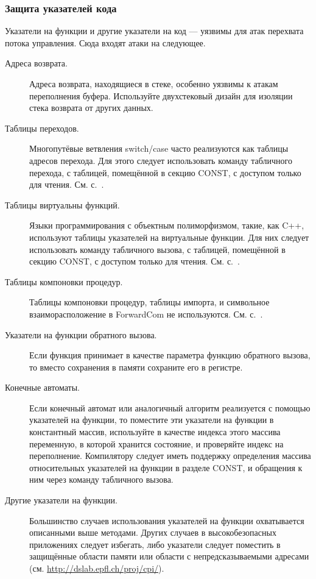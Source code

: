\documentclass[forwardcom.tex]{subfiles}
\begin{document}
\subsubsection{Защита указателей кода}
Указатели на функции и другие указатели на код --- уязвимы для атак перехвата потока управления. Сюда входят атаки на следующее.
\begin{description}
\item[Адреса возврата.]	Адреса возврата, находящиеся в стеке, особенно уязвимы к атакам переполнения буфера. Используйте двухстековый дизайн для изоляции стека возврата от других данных.

\item[Таблицы переходов.] Многопутёвые ветвления switch/case часто реализуются как таблицы адресов перехода. Для этого следует использовать команду табличного перехода, с таблицей, помещённой в секцию CONST, с доступом только для чтения. См. с.~\pageref{jumpTableInstruction}.

\item[Таблицы виртуальны функций.] Языки программирования с объектным полиморфизмом, такие, как C++, используют таблицы указателей на виртуальные функции. Для них следует использовать команду табличного вызова, с таблицей, помещённой в секцию CONST, с доступом только для чтения. См. с.~\pageref{jumpTableInstruction}.

\item[Таблицы компоновки процедур.] Таблицы компоновки процедур, таблицы импорта, и символьное взаиморасположение в  ForwardCom не используются. См. с.~\pageref{libraryLinkMethods}.

\item[Указатели на функции обратного вызова.] Если функция принимает в качестве параметра функцию обратного вызова, то вместо сохранения в памяти сохраните его в регистре.

\item[Конечные автоматы.] Если конечный автомат или аналогичный алгоритм реализуется с помощью указателей на функции, то поместите эти указатели на функции в константный массив, используйте в качестве индекса этого массива переменную, в которой хранится состояние, и проверяйте индекс на переполнение. Компилятору следует иметь поддержку определения массива относительных указателей на функции в разделе CONST, и обращения к ним через команду табличного вызова.

\item[Другие указатели на функции.] Большинство случаев использования указателей на функции охватывается описанными выше методами. Других случаев в высокобезопасных приложениях следует избегать, либо указатели следует поместить в защищённые области памяти или области с непредсказываемыми адресами (см. \url{http://dslab.epfl.ch/proj/cpi/}).
\end{description}
\end{document}
